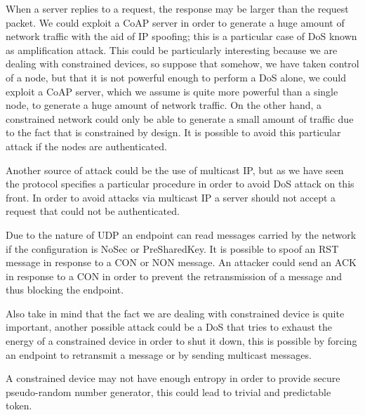 	When a server replies to a request, the response may be larger than the request packet.\newline
	We could exploit a CoAP server in order to generate a huge amount of network traffic with the aid of IP spoofing; this is a particular case of DoS known as amplification attack.\newline
	This could be particularly interesting because we are dealing with constrained devices, so suppose that somehow, we have taken control of a node, but that it is not powerful enough to perform a DoS alone, we could exploit a CoAP server, which we assume is quite more powerful than a single node, to generate a huge amount of network traffic.\newline
	On the other hand, a constrained network could only be able to generate a small amount of traffic due to the fact that is constrained by design.\newline
	It is possible to avoid this particular attack if the nodes are authenticated.\newline
	
	Another source of attack could be the use of multicast IP, but as we have seen the protocol specifies a particular procedure in order to avoid DoS attack on this front.\newline
	In order to avoid attacks via multicast IP a server should not accept a request that could not be authenticated.
	
	Due to the nature of UDP an endpoint can read messages carried by the network if the configuration is NoSec or PreSharedKey.\newline
	It is possible to spoof an RST message in response to a CON or NON message.
	An attacker could send an ACK in response to a CON in order to prevent the retransmission of a message and thus blocking the endpoint.\newline
	
	Also take in mind that the fact we are dealing with constrained device is quite important, another possible attack could be a DoS that tries to exhaust the energy of a constrained device in order to shut it down, this is possible by forcing an endpoint to retransmit a message or by sending multicast messages.\newline
	
	A constrained device may not have enough entropy in order to provide secure pseudo-random number generator, this could lead to trivial and predictable token.\newline
	
